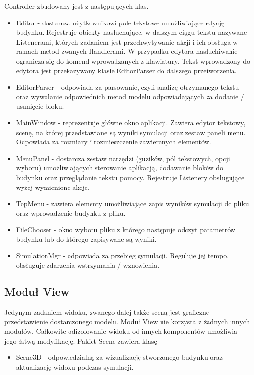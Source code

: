Controller zbudowany jest z następujących klas.
\begin{itemize}
\item Editor - dostarcza użytkownikowi pole tekstowe umożliwiające edycję budynku. Rejestruje obiekty nasłuchujące, w dalszym ciągu tekstu nazywane Listenerami, których zadaniem jest przechwytywanie akcji i ich obsługa w ramach metod zwanych Handlerami. W przypadku edytora nasłuchiwanie ogranicza się do komend wprowadzanych z klawiatury. Tekst wprowadzony do edytora jest przekazywany klasie EditorParser do dalszego przetworzenia.
\item EditorParser - odpowiada za parsowanie, czyli analizę otrzymanego tekstu oraz wywołanie odpowiednich metod modelu odpowiadających za 
dodanie / usunięcie bloku.
\item MainWindow - reprezentuje główne okno aplikacji. Zawiera edytor tekstowy, scenę, na której przedstawiane są wyniki symulacji oraz 
zestaw paneli menu. Odpowiada za rozmiary i rozmieszczenie zawieranych elementów.
\item MenuPanel - dostarcza zestaw narzędzi (guzików, pól tekstowych, opcji wyboru) umożliwiających sterowanie aplikacją, dodawanie bloków do budynku oraz przeglądanie tekstu pomocy. Rejestruje Listenery obsługujące wyżej wymienione akcje.
\item TopMenu - zawiera elementy umożliwiające zapis wyników symulacji do pliku oraz wprowadzenie budynku z pliku.
\item FileChooser - okno wyboru pliku z którego następuje odczyt parametrów budynku lub do którego zapisywane są wyniki.
\item SimulationMgr - odpowiada za przebieg symulacji. Reguluje jej tempo, obsługuje zdarzenia wstrzymania / wznowienia.
\end {itemize}

\subsection {Moduł View}
Jedynym zadaniem widoku, zwanego dalej także sceną jest graficzne przedstawienie dostarczonego modelu.
Moduł View nie korzysta z żadnych innych modułów.
Całkowite odizolowanie widoku od innych komponentów umożliwia jego łatwą modyfikację. Pakiet Scene zawiera klasę
\begin {itemize}
\item Scene3D - odpowiedzialną za wizualizację stworzonego budynku oraz aktualizację widoku podczas symulacji.
\end {itemize}
